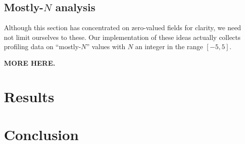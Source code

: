 \documentclass[preprint]{acmconf}
\begin{document}
\subsection{Mostly-$N$ analysis}
Although this section has concentrated on zero-valued fields for
clarity, we need not limit ourselves to these.  Our implementation of
these ideas actually collects profiling data on ``mostly-$N$'' values
with $N$ an integer in the range $[-5,5]$.

{\bf MORE HERE.}

\section{Results}
\section{Conclusion}




%
\end{document}
